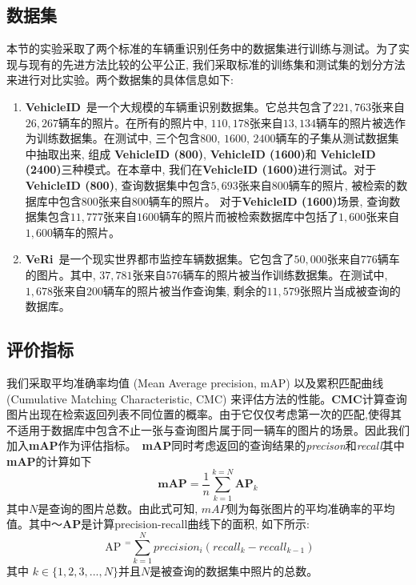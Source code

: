   \subsection{数据集}
  本节的实验采取了两个标准的车辆重识别任务中的数据集进行训练与测试。为了实现与现有的先进方法比较的公平公正, 我们采取标准的训练集和测试集的划分方法来进行对比实验。两个数据集的具体信息如下:
  \begin{enumerate}
    \item \textbf{VehicleID}~\cite{liu2016deep}是一个大规模的车辆重识别数据集。它总共包含了$221,763$张来自$26,267$辆车的照片。在所有的照片中, $110,178$张来自$13,134$辆车的照片被选作为训练数据集。在测试中, 三个包含$800$, $1600$, $2400$辆车的子集从测试数据集中抽取出来, 组成 \textbf{VehicleID (800)}, \textbf{VehicleID (1600)}和 \textbf{VehicleID (2400)}三种模式。在本章中, 我们在\textbf{VehicleID (1600)}进行测试。对于\textbf{VehicleID (800)}, 查询数据集中包含$5,693$张来自$800$辆车的照片, 被检索的数据库中包含$800$张来自$800$辆车的照片。 对于\textbf{VehicleID (1600)}场景, 查询数据集包含$11,777$张来自$1600$辆车的照片而被检索数据库中包括了$1,600$张来自$1,600$辆车的照片。
    \item \textbf{VeRi}~\cite{liu2016deep}是一个现实世界都市监控车辆数据集。它包含了$50,000$张来自$776$辆车的图片。其中, $37,781$张来自$576$辆车的照片被当作训练数据集。在测试中, $1,678$张来自$200$辆车的照片被当作查询集, 剩余的$11,579$张照片当成被查询的数据库。
  \end{enumerate}
  \subsection{评价指标}
  我们采取平均准确率均值 (Mean Average precision, mAP) 以及累积匹配曲线 (Cumulative Matching Characteristic, CMC) 来评估方法的性能。\textbf{CMC}计算查询图片出现在检索返回列表不同位置的概率。由于它仅仅考虑第一次的匹配,使得其不适用于数据库中包含不止一张与查询图片属于同一辆车的图片的场景。因此我们加入\textbf{mAP}作为评估指标。~\textbf{mAP}同时考虑返回的查询结果的\textit{precison}和\textit{recall}其中 \textbf{mAP}的计算如下
  \begin{equation}
     \textbf{mAP} = \frac{1}{n} \sum_{k=1}^{k= N} \textbf{AP}_k
  \end{equation}
  其中$N$是查询的图片总数。由此式可知, $mAP$则为每张图片的平均准确率的平均值。其中～\textbf{AP}是计算precision-recall曲线下的面积, 如下所示:
  \begin{equation}
    \text { AP }^{=} \sum_{k=1}^{N} precision _{i}\left( recall _{k}- recall _{k-1}\right)
\end{equation}
其中 $k \in \{1, 2, 3, ..., N\}$并且$N$是被查询的数据集中照片的总数。

